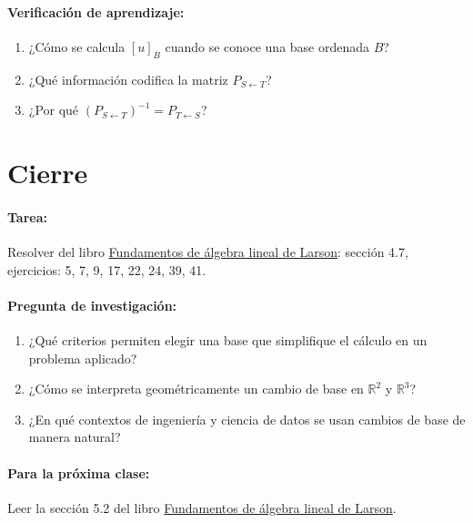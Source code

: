 \documentclass[a4,11pt]{aleph-notas}
\begin{document}
\paragraph{Verificación de aprendizaje:}
\begin{enumerate}[leftmargin=*]
    \item ¿Cómo se calcula $[u]_B$ cuando se conoce una base ordenada $B$?
    \item ¿Qué información codifica la matriz $P_{S\gets T}$?
    \item ¿Por qué $(P_{S\gets T})^{-1}=P_{T\gets S}$?
\end{enumerate}

\section*{Cierre}

\paragraph{Tarea:}
Resolver del libro \href{https://catalogobiblioteca.puce.edu.ec/cgi-bin/koha/opac-detail.pl?biblionumber=86081}{Fundamentos de álgebra lineal de Larson}: sección 4.7, ejercicios: 5, 7, 9, 17, 22, 24, 39, 41.

\paragraph{Pregunta de investigación:}
\begin{enumerate}[leftmargin=*]
    \item ¿Qué criterios permiten elegir una base que simplifique el cálculo en un problema aplicado?
    \item ¿Cómo se interpreta geométricamente un cambio de base en $\mathbb{R}^2$ y $\mathbb{R}^3$?
    \item ¿En qué contextos de ingeniería y ciencia de datos se usan cambios de base de manera natural?
\end{enumerate}

\paragraph{Para la próxima clase:}  
Leer la sección 5.2 del libro \href{https://catalogobiblioteca.puce.edu.ec/cgi-bin/koha/opac-detail.pl?biblionumber=86081}{Fundamentos de álgebra lineal de Larson}.
\end{document}

